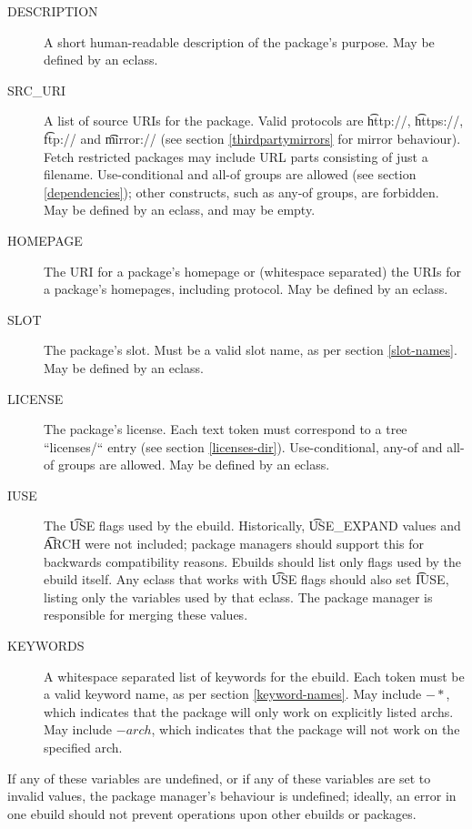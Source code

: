 \begin{description}
\item[DESCRIPTION] A short human-readable description of the package's purpose. May be defined by an
    eclass.
\item[SRC\_URI] A list of source URIs for the package. Valid protocols are \t{http://},
    \t{https://}, \t{ftp://} and \t{mirror://} (see section \ref{thirdpartymirrors} for mirror behaviour).
    Fetch restricted packages may include URL parts consisting of just a filename.  Use-conditional and
    all-of groups are allowed (see section \ref{dependencies}); other constructs,
    such as any-of groups, are forbidden. May be defined by an eclass, and may be empty.
\item[HOMEPAGE] The URI for a package's homepage or (whitespace separated) the URIs for a package's
    homepages, including protocol. May be defined by an eclass.
\item[SLOT] The package's slot. Must be a valid slot name, as per section \ref{slot-names}. May
    be defined by an eclass.
\item[LICENSE] The package's license. Each text token must correspond to a tree ``licenses/`` entry
    (see section \ref{licenses-dir}). Use-conditional, any-of and all-of groups are allowed.
    May be defined by an eclass. \label{ebuild-var-LICENSE}
\item[IUSE] The \t{USE} flags used by the ebuild. Historically, \t{USE\_EXPAND} values and \t{ARCH}
    were not included; package managers should support this for backwards compatibility reasons. Ebuilds
    should list only flags used by the ebuild itself. Any eclass that works with \t{USE} flags
    should also set \t{IUSE}, listing only the variables used by that eclass. The package manager is
    responsible for merging these values.
\item[KEYWORDS] A whitespace separated list of keywords for the ebuild. Each token must be a
    valid keyword name, as per section \ref{keyword-names}. May include $-*$, which
    indicates that the package will only work on explicitly listed archs. May include $-arch$,
    which indicates that the package will not work on the specified arch.
\end{description}


If any of these variables are undefined, or if any of these variables are set to invalid values,
the package manager's behaviour is undefined; ideally, an error in one ebuild should not prevent
operations upon other ebuilds or packages.

